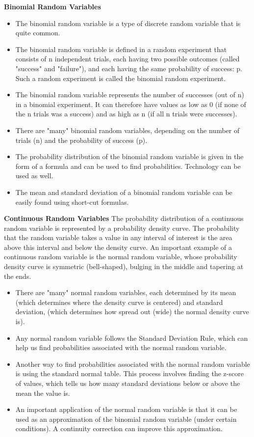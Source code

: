 \documentclass[10pt, a4paper]{article}
\begin{document}
\textbf{Binomial Random Variables}
\begin{itemize}
\item The binomial random variable is a type of discrete random variable that is quite common.
\item The binomial random variable is defined in a random experiment that consists of n independent trials, each having two possible outcomes (called "success" and "failure"), and each having the same probability of success: p. Such a random experiment is called the binomial random experiment.
\item The binomial random variable represents the number of successes (out of n) in a binomial experiment. It can therefore have values as low as 0 (if none of the n trials was a success) and as high as n (if all n trials were successes).
\item There are "many" binomial random variables, depending on the number of trials (n) and the probability of success (p).
\item The probability distribution of the binomial random variable is given in the form of a formula and can be used to find probabilities. Technology can be used as well.
\item The mean and standard deviation of a binomial random variable can be easily found using short-cut formulas.
\end{itemize}
\textbf{Continuous Random Variables}
The probability distribution of a continuous random variable is represented by a probability density curve. The probability that the random variable takes a value in any interval of interest is the area above this interval and below the density curve.
An important example of a continuous random variable is the normal random variable, whose probability density curve is symmetric (bell-shaped), bulging in the middle and tapering at the ends.
\begin{itemize}
  \item There are "many" normal random variables, each determined by its mean 
(which determines where the density curve is centered) and standard deviation, (which determines how spread out (wide) the normal density curve is).
\item Any normal random variable follows the Standard Deviation Rule, which can help us find probabilities associated with the normal random variable.
\item Another way to find probabilities associated with the normal random variable is using the standard normal table. This process involves finding the z-score of values, which tells us how many standard deviations below or above the mean the value is.
\item An important application of the normal random variable is that it can be used as an approximation of the binomial random variable (under certain conditions). A continuity correction can improve this approximation.
\end{itemize}
\end{document}
